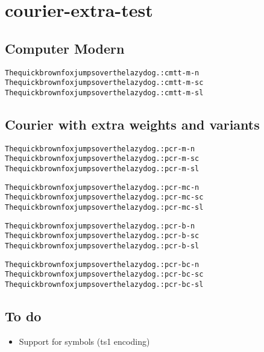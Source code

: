 \documentclass{article}
\newcommand{\quickbrownfox}{The quick brown fox jumps over the lazy dog.}
\begin{document}
\section{courier-extra-test}

\subsection{Computer Modern}

\begin{alltt}
\quickbrownfox{} : cmtt-m-n
\quickbrownfox{} : cmtt-m-sc
\quickbrownfox{} : cmtt-m-sl
\end{alltt}

\subsection{Courier with extra weights and variants}

\begin{alltt}
\quickbrownfox{} : pcr-m-n
\quickbrownfox{} : pcr-m-sc
\quickbrownfox{} : pcr-m-sl

\quickbrownfox{} : pcr-mc-n
\quickbrownfox{} : pcr-mc-sc
\quickbrownfox{} : pcr-mc-sl

\quickbrownfox{} : pcr-b-n
\quickbrownfox{} : pcr-b-sc
\quickbrownfox{} : pcr-b-sl

\quickbrownfox{} : pcr-bc-n
\quickbrownfox{} : pcr-bc-sc
\quickbrownfox{} : pcr-bc-sl
\end{alltt}

\subsection{To do}
\begin{itemize}
  \item Support for symbols (ts1 encoding)
\end{itemize}
\end{document}
